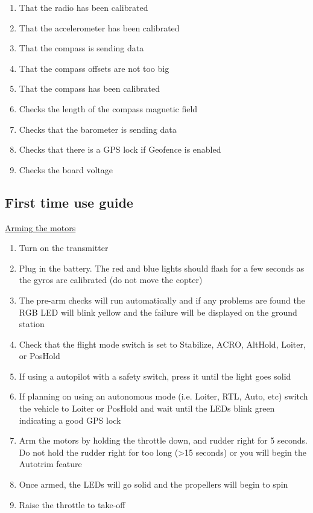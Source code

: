 \begin{enumerate}

    \item That the radio has been calibrated
    \item That the accelerometer has been calibrated
    \item That the compass is sending data
    \item That the compass offsets are not too big
    \item That the compass has been calibrated
    \item Checks the length of the compass magnetic field
    \item Checks that the barometer is sending data
    \item Checks that there is a GPS lock if Geofence is enabled
    \item Checks the board voltage
    
\end{enumerate}

\subsection{First time use guide}

\underline{Arming the motors}

\begin{enumerate}

    \item Turn on the transmitter
    \item Plug in the battery. The red and blue lights should flash for a few seconds as the gyros are calibrated (do not move the copter)
    \item The pre-arm checks will run automatically and if any problems are found the RGB LED will blink yellow and the failure will be displayed on the ground station
    \item Check that the flight mode switch is set to Stabilize, ACRO, AltHold, Loiter, or PosHold
    \item If using a autopilot with a safety switch, press it until the light goes solid
    \item If planning on using an autonomous mode (i.e. Loiter, RTL, Auto, etc) switch the vehicle to Loiter or PosHold and wait until the LEDs blink green indicating a good GPS lock
    \item Arm the motors by holding the throttle down, and rudder right for 5 seconds. Do not hold the rudder right for too long (>15 seconds) or you will begin the Autotrim feature
    \item Once armed, the LEDs will go solid and the propellers will begin to spin
    \item Raise the throttle to take-off
    
\end{enumerate}

